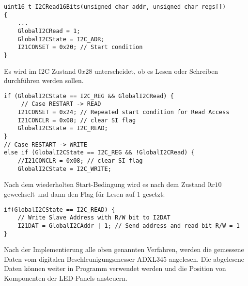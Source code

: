 \begin{lstlisting}
uint16_t I2CRead16Bits(unsigned char addr, unsigned char regs[])  
{
	...
	GlobalI2CRead = 1;
	GlobalI2CState = I2C_ADR;
	I21CONSET = 0x20; // Start condition
}
\end{lstlisting}

Es wird im I2C Zustand $0x28$ unterscheidet, ob es Lesen oder Schreiben durchführen werden sollen.
\begin{lstlisting}
if (GlobalI2CState == I2C_REG && GlobalI2CRead) {
     // Case RESTART -> READ
	I21CONSET = 0x24; // Repeated start condition for Read Access
	I21CONCLR = 0x08; // clear SI flag
	GlobalI2CState = I2C_READ;
}
// Case RESTART -> WRITE
else if (GlobalI2CState == I2C_REG && !GlobalI2CRead) {
	//I21CONCLR = 0x08; // clear SI flag
	GlobalI2CState = I2C_WRITE;
\end{lstlisting}

Nach dem wiederholten Start-Bedingung wird es nach dem Zustand $0x10$ gewechselt und dann den Flag für Lesen auf 1 gesetzt:
\begin{lstlisting}
if(GlobalI2CState == I2C_READ) {
	// Write Slave Address with R/W bit to I2DAT
	I21DAT = GlobalI2CAddr | 1; // Send address and read bit R/W = 1
}
\end{lstlisting}

Nach der Implementierung alle oben genannten Verfahren, werden die gemessene Daten vom digitalen Beschleunigungsmesser ADXL345 angelesen. Die abgelesene Daten können weiter in Programm verwendet werden und die Position von Komponenten der LED-Panels ansteuern.

